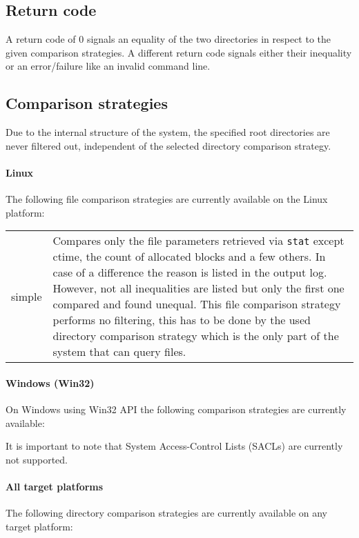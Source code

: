 \documentclass[a4paper]{article}
\begin{document}
	\subsection{Return code}
	\label{subsec:return_code}
	
	A return code of 0 signals an equality of the two directories in respect to the given comparison strategies. A different return code signals either their inequality or an error/failure like an invalid command line.
	
	\subsection{Comparison strategies}
	\label{subsec:comparison_strategies}
	
	Due to the internal structure of the system, the specified root directories are never filtered out, independent of the selected directory comparison strategy.
	
	\paragraph{Linux} The following file comparison strategies are currently available on the Linux platform:
	
	\begin{tabularx}{\linewidth}{lX}
		simple & Compares only the file parameters retrieved via \texttt{stat} except ctime, the count of allocated blocks and a few others. In case of a difference the reason is listed in the output log. However, not all inequalities are listed but only the first one compared and found unequal. This file comparison strategy performs no filtering, this has to be done by the used directory comparison strategy which is the only part of the system that can query files.
	\end{tabularx}

	\paragraph{Windows (Win32)} On Windows using Win32 API the following comparison strategies are currently available:
	
	It is important to note that System Access-Control Lists (SACLs) are currently not supported.
	
	\paragraph{All target platforms} The following directory comparison strategies are currently available on any target platform:
	
\end{document}
